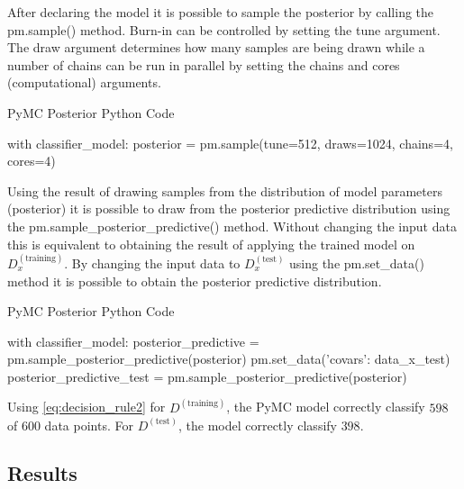 \documentclass[a4paper,11pt, oneside]{article}
\theoremstyle{definition}
\begin{document}
	
	After declaring the model it is possible to sample the posterior by calling the pm.sample() method. Burn-in can be controlled by setting the tune argument. The draw argument determines how many samples are being drawn while a number of chains can be run in parallel by setting the chains and cores (computational) arguments. 	
	\begin{algorithm}[H]
		\label{algo:posteriro}
		\caption{PyMC Posterior Python Code}
		\begin{python}
			with classifier_model:
			posterior = pm.sample(tune=512, draws=1024, chains=4, cores=4)
		\end{python}  
	\end{algorithm}
	
	Using the result of drawing samples from the distribution of model parameters (posterior) it is possible to draw from the posterior predictive distribution using the pm.sample\_posterior\_predictive() method. Without changing the input data this is equivalent to obtaining the result of applying the trained model on $D_x^{(\text{training})}$. By changing the input data to $D_x^{(\text{test})}$ using the pm.set\_data() method it is possible to obtain the posterior predictive distribution.
	
	\begin{algorithm}[H]
		\label{algo:posteriro_predictive}
		\caption{PyMC Posterior Python Code}
		\begin{python}
			with classifier_model:
			posterior_predictive = pm.sample_posterior_predictive(posterior)
			pm.set_data({'covars': data_x_test})
			posterior_predictive_test = pm.sample_posterior_predictive(posterior)
		\end{python}
	\end{algorithm}
	
	Using \ref{eq:decision_rule2} for $D^{(\text{training})}$, the PyMC model correctly classify $598$ of $600$ data points. For $D^{(\text{test})}$, the model correctly classify $398$.
	
	\subsection{Results}
\end{document}
